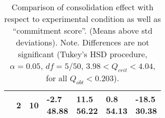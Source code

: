 \begin{table*}
\begin{tabularx}{\textwidth}{XXXXXXX}
      &
      2
      &
      10
      & \cellcontent{-2.7\\48.88}
      & \cellcontent{11.5\\56.22}
      & \cellcontent{0.8\\54.13}
      & \cellcontent{-18.5\\30.38}
      \\

      \bottomrule
    \end{tabularx}
    \endgroup
  \caption{Comparison of consolidation effect with respect to
    experimental condition as well as ``commitment score''. (Means
    above std deviations). Note. Differences are not significant
    (Tukey's HSD procedure, $\alpha=0.05$, $df = 5/50$,  $3.98 <
    Q_{crit} < 4.04$, for all $Q_{obt}<0.203$).}
  \label{tab:commitment}
\end{table*}




